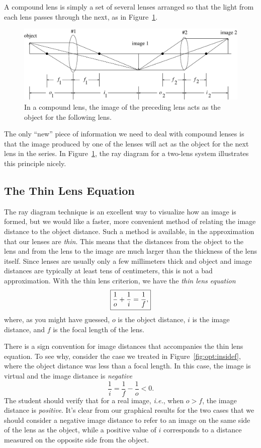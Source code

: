 A compound lens is simply a set of several lenses arranged so that the light
from each lens passes through the next, as in Figure~\ref{fig:opt:compounddef}.
\begin{figure}[h]
\centering 
\epsfxsize=14cm \includegraphics[scale=0.4]{9_imaging/compounddef.eps}
\caption{In a compound lens, the image of the preceding lens acts as the object
for the following lens.}
\label{fig:opt:compounddef}
\end{figure}
The only ``new'' piece of information we need to deal with compound lenses is
that the image produced by one of the lenses will act as the object for the 
next lens in the series. In Figure~\ref{fig:opt:compounddef}, the ray diagram 
for a two-lens system illustrates this principle nicely.

\subsection{The Thin Lens Equation} 

The ray diagram technique is an excellent way to visualize how an image is 
formed, but we would like a faster, more convenient method of relating the 
image distance to the object distance. Such a method is available, in the 
approximation that our lenses are {\it thin}. This means that the distances 
from the object to the lens and from the lens to the image are much larger 
than the thickness of the lens itself.  Since lenses are usually only a few 
millimeters thick and object and image distances are typically at least tens 
of centimeters, this is not a bad approximation.  With the thin lens 
criterion, we have 
the {\em thin lens equation}
\begin{equation}
\fbox{$ \displaystyle \frac{1}{o} + \frac{1}{i} = \frac{1}{f}, $} \label{eq:opt:thinlens}
\end{equation}
where, as you might have guessed, $o$ is the object distance, $i$ is the image 
distance, and $f$ is the focal length of the lens.

There is a sign convention for image distances that accompanies the thin lens 
equation. To see why, consider the case we treated in 
Figure~\ref{fig:opt:insidef}, where the object distance was less than a focal
length. In this case, the image is virtual and the image distance is 
{\it negative}
$$
\frac{1}{i}=\frac{1}{f}-\frac{1}{o} < 0.
$$
The student should verify that for a real image, {\it i.e.}, when $o>f$, the 
image distance is {\it positive}.  It's clear from our graphical results for 
the two cases that we should consider a negative image distance to refer to an
image on the same side of the lens as the object, while a positive value of 
$i$ corresponds to a distance measured on the opposite side from the object.

